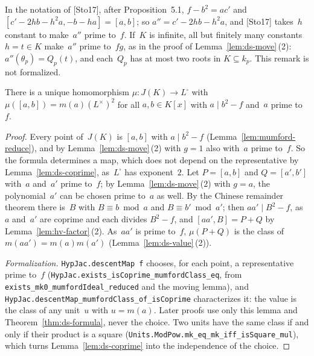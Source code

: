 In the notation of [Sto17], after Proposition~5.1, $f - b^2 = ac'$ and
$[c' - 2hb - h^2 a, -b - ha] = [a, b]$; so $a'' = c' - 2hb - h^2 a$, and [Sto17] takes~$h$
constant to make~$a''$ prime to~$f$. If~$K$ is infinite, all but finitely many constants
$h = t \in K$ make~$a''$ prime to~$fg$, as in the proof of Lemma~\ref{lem:ds-move}\,(2):
$a''(\theta_p) = Q_p(t)$, and each~$Q_p$ has at most two roots in $K \subseteq k_p$. This remark
is not formalized.

\begin{definition}
\label{def:ds-mu}
\leanok
{}
There is a unique homomorphism $\mu \colon J(K) \to L^\square$ with
$\mu([a, b]) = m(a)(L^\times)^2$ for all $a, b \in K[x]$ with $a \mid b^2 - f$ and~$a$ prime
to~$f$.
\end{definition}

\begin{proof}
\leanok
{}
Every point of~$J(K)$ is $[a, b]$ with $a \mid b^2 - f$ (Lemma~\ref{lem:mumford-reduce}), and by
Lemma~\ref{lem:ds-move}\,(2) with $g = 1$ also with~$a$ prime to~$f$. So the formula determines a
map, which does not depend on the representative by Lemma~\ref{lem:ds-coprime}, as~$L^\square$
has exponent~$2$. Let $P = [a, b]$ and $Q = [a', b']$ with~$a$ and~$a'$ prime to~$f$; by
Lemma~\ref{lem:ds-move}\,(2) with $g = a$, the polynomial~$a'$ can be chosen prime to~$a$ as well.
By the Chinese remainder theorem there is~$B$ with $B \equiv b \bmod a$ and
$B \equiv b' \bmod a'$; then $aa' \mid B^2 - f$, as~$a$ and~$a'$ are coprime and each divides
$B^2 - f$, and $[aa', B] = P + Q$ by Lemma~\ref{lem:hv-factor}\,(2). As~$aa'$ is prime to~$f$,
$\mu(P + Q)$ is the class of $m(aa') = m(a)m(a')$ (Lemma~\ref{lem:ds-value}\,(2)).

\emph{Formalization.} \texttt{HypJac.descentMap f} chooses, for each point, a representative prime
to~$f$ (\texttt{HypJac.exists\_isCoprime\_mumfordClass\_eq}, from
\texttt{exists\_mk0\_mumfordIdeal\_reduced} and the moving lemma), and
\texttt{HypJac.descentMap\_mumfordClass\_of\_isCoprime} characterizes it: the value is the class of
any unit~$u$ with $u = m(a)$. Later proofs use only this lemma and
Theorem~\ref{thm:ds-formula}, never the choice. Two units have the same class if and only if their
product is a square (\texttt{Units.ModPow.mk\_eq\_mk\_iff\_isSquare\_mul}), which turns
Lemma~\ref{lem:ds-coprime} into the independence of the choice.
\end{proof}

